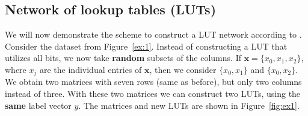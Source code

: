 \subsection{Network of lookup tables (LUTs)}
We will now demonstrate the scheme to construct a LUT network according to \cite{bib:chatterjee2018learning}. Consider the dataset from Figure~\ref{ex:1}. Instead of constructing a LUT that utilizes all bits, we now take \textbf{random} subsets of the columns. If $\bm{x} = \{x_0,x_1,x_2\}$, where $x_j$ are the individual entries of $\bm{x}$, then we consider $\{x_0,x_1\}$ and $\{x_0,x_2\}$. We obtain two matrices with seven rows (same as before), but only two columns instead of three. With these two matrices we can construct two LUTs, using the \textbf{same} label vector $y$. The matrices and new LUTs are shown in Figure~\ref{fig:ex1}.

